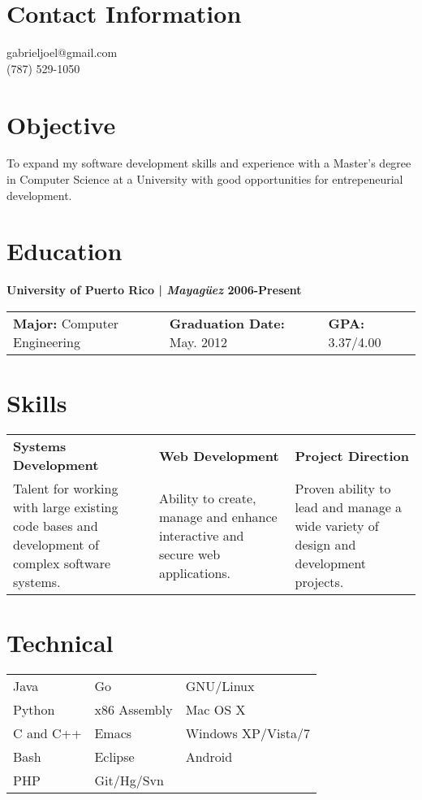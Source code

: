 \documentclass[margin,line]{res}
\begin{document}


\begin{resume}
\section{\sc Contact Information}
\vspace{.05in}
gabrieljoel@gmail.com \\
(787) 529-1050       



\section{\sc Objective}
To expand my software development skills and experience with a Master's degree in Computer Science at a University with good opportunities for entrepeneurial development.  

\section{\sc Education}

{\bf University of Puerto Rico | {\em Mayag\"uez } \hfill {\bf 2006-Present } }
\vspace{-.01cm}
\begin{tabular}{@{}p{2in}p{2in}p{2in}}
 {\bf Major:} Computer Engineering           & {\bf Graduation Date:} May. 2012  & {\bf GPA:} 3.37/4.00  \\            
\end{tabular}


\section{\sc Skills}
\begin{tabular}{@{}p{2in}p{2in}p{1.7in}}
{\bf Systems Development}             & {\bf Web Development}  & {\bf Project Direction} \\            
Talent for working with large existing code bases and development of complex software systems. & Ability to create, manage and enhance interactive and secure web applications. & Proven ability to lead and manage a wide variety of design and development projects.   
\end{tabular}

\section{\sc Technical}
\begin{tabular}{@{}p{2in}p{2in}p{2in}}
 Java           & Go  & GNU/Linux  \\            
Python   & x86 Assembly & Mac OS X   \\
C and C++ & Emacs & Windows XP/Vista/7 \\
Bash & Eclipse & Android \\
PHP & Git/Hg/Svn  & 
\end{tabular}


\end{resume}
\end{document}
